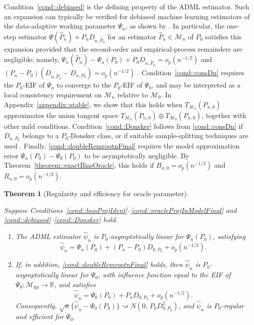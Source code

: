 \documentclass[11pt]{article}
\newtheorem{theorem}{Theorem}
\theoremstyle{definition}
\begin{document}
Condition~\ref{cond::debiased} is the defining property of the ADML estimator. Such an expansion can typically be verified for debiased machine learning estimators of the data-adaptive working parameter \(\Psi_n\), as shown by \cite{dataAdaptTargetParam}. In particular, the one-step estimator \(\Psi(\widehat{P}_n) + P_n D_{n,\widehat{P}_n}\) for an estimator \(\widehat{P}_n \in \mathcal{M}_n\) of \(P_0\) satisfies this expansion provided that the second-order and empirical-process remainders are negligible; namely, \(\Psi_n(\widehat{P}_n) - \Psi_n(P_0) + P_0 D_{n,\widehat{P}_n} = o_p(n^{-1/2})\) and \((P_n - P_0)(D_{n,\widehat{P}_n} - D_{n,P_0}) = o_p(n^{-1/2})\) \citep{bickel1993efficient, dataAdaptTargetParam}. Condition~\ref{cond::consDn} requires the \(P_0\)-EIF of \(\Psi_n\) to converge to the \(P_0\)-EIF of \(\Psi_0\), and may be interpreted as a local consistency requirement on \(\mathcal{M}_n\) relative to \(\mathcal{M}_0\). In Appendix~\ref{appendix::stable}, we show that this holds when \(T_{\mathcal{M}_n}(P_{n,0})\) approximates the union tangent space \(T_{\mathcal{M}_n}(P_{n,0}) \oplus T_{\mathcal{M}_0}(P_{n,0})\), together with other mild conditions. Condition~\ref{cond::Donsker} follows from \ref{cond::consDn} if \(D_{n,P_0}\) belongs to a \(P_0\)-Donsker class, or if suitable sample-splitting techniques are used \citep{CVTMLEworking2010, DoubleML}. Finally, \ref{cond::doubleRemrootnFinal} requires the model approximation error \(\Psi_n(P_0) - \Psi_0(P_0)\) to be asymptotically negligible. By Theorem~\ref{theorem::exactBiasOracle}, this holds if \(B_{n,0} = o_p(n^{-1/2})\) and \(R_{n,0} = o_p(n^{-1/2})\).




\begin{theorem}[Regularity and efficiency for oracle parameter]
\label{theorem::limitDataAdaptOracle}
\label{theorem::oracleEff}

Suppose Conditions~\ref{cond::lossProjIdent}--\ref{cond::oracleProjInModelFinal} and \ref{cond::debiased}--\ref{cond::Donsker} hold.
\begin{enumerate}
    \item[(i)] The ADML estimator \(\widehat{\psi}_n\) is \(P_0\)-asymptotically linear for \(\Psi_n(P_0)\), satisfying
    \[
    \widehat{\psi}_n = \Psi_n(P_0) + (P_n-P_0)D_{0,P_0} + o_p(n^{-1/2}).
    \]


 \item[(ii)] If, in addition, \ref{cond::doubleRemrootnFinal} holds, then \(\widehat{\psi}_n\) is \(P_0\)-asymptotically linear for \(\Psi_0\), with influence function equal to the EIF of \(\Psi_0:\mathcal{M}_{\mathrm{np}}\to\mathbb{R}\), and satisfies
\[
\widehat{\psi}_n = \Psi_0(P_0) + P_n D_{0,P_0} + o_p(n^{-1/2}).
\]
Consequently, \(\sqrt{n}\{\widehat{\psi}_n-\Psi_0(P_0)\} \rightsquigarrow N\!\left(0,\,P_0D_{0,P_0}^2\right)\), and \(\widehat{\psi}_n\) is \(P_0\)-regular and efficient for \(\Psi_0\).
\end{enumerate}
\end{theorem}
\end{document}
